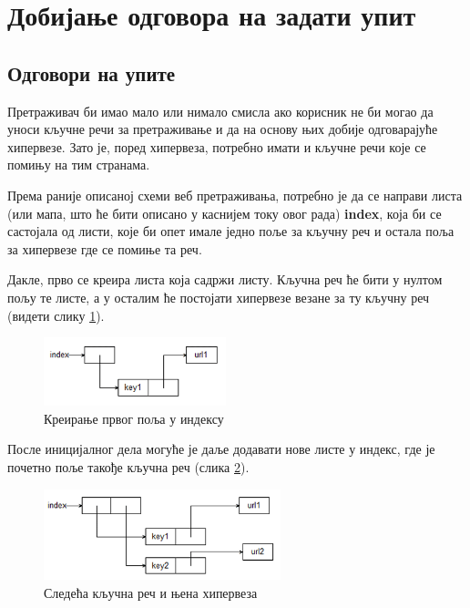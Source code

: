 \section{Добијање одговора на задати упит}

\subsection{Одговори на упите}

Претраживач би имао мало или нимало смисла ако корисник не би могао да уноси
кључне речи за претраживање и да на основу њих добије одговарајуће хипервезе.
Зато је, поред хипервеза, потребно имати и кључне речи које се помињу на тим странама.

Према раније описаној схеми веб претраживања, потребно је да се направи листа (или мапа, што ће бити описано у каснијем току овог рада) \textbf{index}, која би се састојала од листи, које би опет имале једно поље за кључну реч и остала поља за хипервезе где се помиње та реч.

Дакле, прво се креира листа која садржи листу. Кључна реч ће бити у нултом пољу
те листе, а у осталим ће постојати хипервезе везане за ту кључну реч (видети слику \ref{slike:indeks1}).

\begin{figure}[here]
\centering
\includegraphics[height=75px, width=200px]{index1.png}
\caption{Креирање првог поља у индексу}
\label{slike:indeks1}
\end{figure}

После иницијалног дела могуће је даље додавати нове листе у индекс, где је почетно поље такође кључна реч (слика \ref{slike:index2}).\\

\begin{figure}[here]
\centering
\includegraphics[height=100px, width=260px]{index2.png}
\caption{Следећа кључна реч и њена хипервеза}
\label{slike:index2}
\end{figure}

